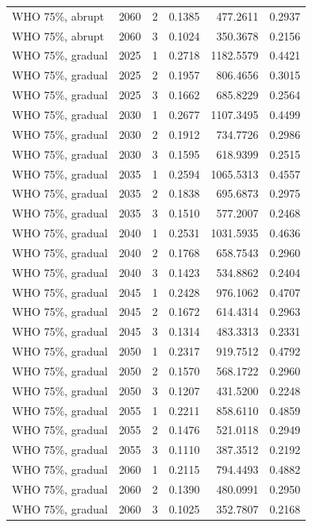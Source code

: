 \begin{longtable}{lrrrrr}
WHO 75\%, abrupt & 2060 & 2 & 0.1385 & 477.2611 & 0.2937 \\
WHO 75\%, abrupt & 2060 & 3 & 0.1024 & 350.3678 & 0.2156 \\
WHO 75\%, gradual & 2025 & 1 & 0.2718 & 1182.5579 & 0.4421 \\
WHO 75\%, gradual & 2025 & 2 & 0.1957 & 806.4656 & 0.3015 \\
WHO 75\%, gradual & 2025 & 3 & 0.1662 & 685.8229 & 0.2564 \\
WHO 75\%, gradual & 2030 & 1 & 0.2677 & 1107.3495 & 0.4499 \\
WHO 75\%, gradual & 2030 & 2 & 0.1912 & 734.7726 & 0.2986 \\
WHO 75\%, gradual & 2030 & 3 & 0.1595 & 618.9399 & 0.2515 \\
WHO 75\%, gradual & 2035 & 1 & 0.2594 & 1065.5313 & 0.4557 \\
WHO 75\%, gradual & 2035 & 2 & 0.1838 & 695.6873 & 0.2975 \\
WHO 75\%, gradual & 2035 & 3 & 0.1510 & 577.2007 & 0.2468 \\
WHO 75\%, gradual & 2040 & 1 & 0.2531 & 1031.5935 & 0.4636 \\
WHO 75\%, gradual & 2040 & 2 & 0.1768 & 658.7543 & 0.2960 \\
WHO 75\%, gradual & 2040 & 3 & 0.1423 & 534.8862 & 0.2404 \\
WHO 75\%, gradual & 2045 & 1 & 0.2428 & 976.1062 & 0.4707 \\
WHO 75\%, gradual & 2045 & 2 & 0.1672 & 614.4314 & 0.2963 \\
WHO 75\%, gradual & 2045 & 3 & 0.1314 & 483.3313 & 0.2331 \\
WHO 75\%, gradual & 2050 & 1 & 0.2317 & 919.7512 & 0.4792 \\
WHO 75\%, gradual & 2050 & 2 & 0.1570 & 568.1722 & 0.2960 \\
WHO 75\%, gradual & 2050 & 3 & 0.1207 & 431.5200 & 0.2248 \\
WHO 75\%, gradual & 2055 & 1 & 0.2211 & 858.6110 & 0.4859 \\
WHO 75\%, gradual & 2055 & 2 & 0.1476 & 521.0118 & 0.2949 \\
WHO 75\%, gradual & 2055 & 3 & 0.1110 & 387.3512 & 0.2192 \\
WHO 75\%, gradual & 2060 & 1 & 0.2115 & 794.4493 & 0.4882 \\
WHO 75\%, gradual & 2060 & 2 & 0.1390 & 480.0991 & 0.2950 \\
WHO 75\%, gradual & 2060 & 3 & 0.1025 & 352.7807 & 0.2168 \\

\end{longtable}
